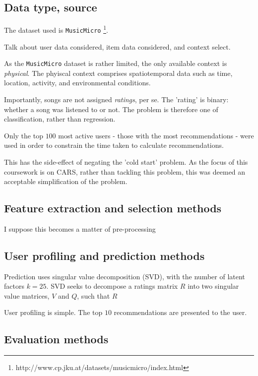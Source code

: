 \documentclass[conference]{IEEEtran}
\begin{document}
\subsection{Data type, source}

The dataset used is \verb|MusicMicro| \footnote{http://www.cp.jku.at/datasets/musicmicro/index.html}.

Talk about user data considered, item data considered, and context select.

As the \verb|MusicMicro| dataset is rather limited, the only available context is \textit{physical}. The phyiscal context comprises spatiotemporal data such as time, location, activity, and environmental conditions. 

Importantly, songs are not assigned \textit{ratings}, per se. The 'rating' is binary: whether a song was listened to or not. The problem is therefore one of classification, rather than regression.


Only the top $100$ most active users - those with the most recommendations - were used in order to constrain the time taken to calculate recommendations.

This has the side-effect of negating the 'cold start' problem.  As the focus of this coursework is on CARS, rather than tackling this problem, this was deemed an acceptable simplification of the problem. 

\subsection{Feature extraction and selection methods}

I suppose this becomes a matter of pre-processing

\subsection{User profiling and prediction methods}

Prediction uses singular value decomposition (SVD), with the number of latent factors $k = 25$. SVD seeks to decompose a ratings matrix $R$ into two singular value matrices, $V$ and $Q$, such that $R$

User profiling is simple.
The top $10$ recommendations are presented to the user. 

\subsection{Evaluation methods}
\end{document}
